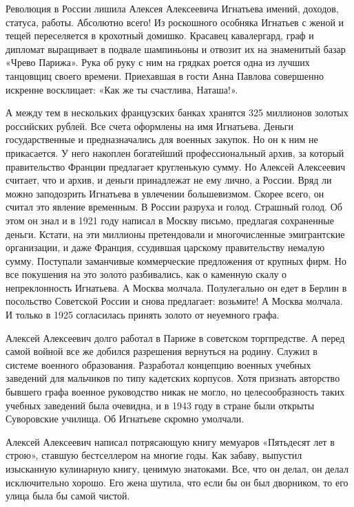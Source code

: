 Революция в России лишила Алексея Алексеевича Игнатьева имений, доходов,
статуса, работы. Абсолютно всего! Из роскошного особняка Игнатьев с женой и
тещей переселяется в крохотный домишко. Красавец кавалергард, граф и дипломат
выращивает в подвале шампиньоны и отвозит их на знаменитый базар «Чрево
Парижа». Рука об руку с ним на грядках роется одна из лучших танцовщиц своего
времени. Приехавшая в гости Анна Павлова совершенно искренне восклицает: «Как
же ты счастлива, Наташа!». 

А между тем в нескольких французских банках хранятся 325 миллионов золотых
российских рублей. Все счета оформлены на имя Игнатьева. Деньги государственные
и предназначались для военных закупок. Но он к ним не прикасается. У него
накоплен богатейший профессиональный архив, за который правительство Франции
предлагает кругленькую сумму. Но Алексей Алексеевич считает, что и архив, и
деньги принадлежат не ему лично, а России. Вряд ли можно заподозрить Игнатьева
в увлечении большевизмом. Скорее всего, он считал это явление временным. В
России разруха и голод. Страшный голод. Об этом он знал и в 1921 году написал в
Москву письмо, предлагая сохраненные деньги. Кстати, на эти миллионы
претендовали и многочисленные эмигрантские организации, и даже Франция,
ссудившая царскому правительству немалую сумму. Поступали заманчивые
коммерческие предложения от крупных фирм. Но все покушения на это золото
разбивались, как о каменную скалу о непреклонность Игнатьева. А Москва молчала.
Полулегально он едет в Берлин в посольство Советской России и снова предлагает:
возьмите! А Москва молчала. И только в 1925 согласилась принять золото от
неуемного графа. 

Алексей Алексеевич долго работал в Париже в советском торгпредстве. А перед
самой войной все же добился разрешения вернуться на родину. Служил в системе
военного образования. Разработал концепцию военных учебных заведений для
мальчиков по типу кадетских корпусов. Хотя признать авторство бывшего графа
военное руководство никак не могло, но целесообразность таких учебных заведений
была очевидна, и в 1943 году в стране были открыты Суворовские училища. Об
Игнатьеве скромно умолчали. 

Алексей Алексеевич написал потрясающую книгу мемуаров «Пятьдесят лет в строю»,
ставшую бестселлером на многие годы. Как забаву, выпустил изысканную кулинарную
книгу, ценимую знатоками. Все, что он делал, он делал исключительно хорошо. Его
жена шутила, что если бы он был дворником, то его улица была бы самой чистой.
